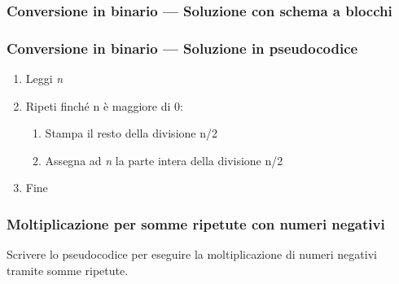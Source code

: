 \documentclass[aspectratio=169]{beamer}
\begin{document}
\begin{frame}
\frametitle{Conversione in binario --- Soluzione con schema a blocchi}
\centering
{}
\end{frame}

\begin{frame}
\frametitle{Conversione in binario --- Soluzione in pseudocodice}
\begin{enumerate}
	\item Leggi \emph{n}
	\item Ripeti finché n è maggiore di 0:
	\begin{enumerate}
		\item Stampa il resto della divisione n/2
		\item Assegna ad \emph{n} la parte intera della divisione n/2
	\end{enumerate}
	\item Fine
\end{enumerate}
\end{frame}

\begin{frame}
\frametitle{Moltiplicazione per somme ripetute con numeri negativi}
Scrivere lo pseudocodice per eseguire la moltiplicazione di numeri negativi tramite somme ripetute.
\end{frame}
\end{document}

